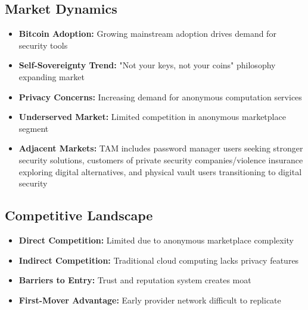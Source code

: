 \subsection{Market Dynamics}
\begin{itemize}
  \item \textbf{Bitcoin Adoption:} Growing mainstream adoption drives demand for security tools
  \item \textbf{Self-Sovereignty Trend:} "Not your keys, not your coins" philosophy expanding market
  \item \textbf{Privacy Concerns:} Increasing demand for anonymous computation services
  \item \textbf{Underserved Market:} Limited competition in anonymous marketplace segment
  \item \textbf{Adjacent Markets:} TAM includes password manager users seeking stronger security solutions\cite{statista2024pwd,lastpass2024}, customers of private security companies/violence insurance exploring digital alternatives\cite{alliedmarket2023}, and physical vault users transitioning to digital security\cite{grandview2024,mordor2024}
\end{itemize}

\subsection{Competitive Landscape}
\begin{itemize}
  \item \textbf{Direct Competition:} Limited due to anonymous marketplace complexity
  \item \textbf{Indirect Competition:} Traditional cloud computing lacks privacy features
  \item \textbf{Barriers to Entry:} Trust and reputation system creates moat
  \item \textbf{First-Mover Advantage:} Early provider network difficult to replicate
\end{itemize}

